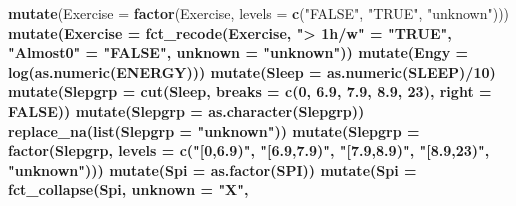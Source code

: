 \documentclass[
]{article}
\newenvironment{Shaded}{\begin{snugshade}}{\end{snugshade}}
\newcommand{\CommentTok}[1]{\textcolor[rgb]{0.56,0.35,0.01}{\textit{#1}}}
\newcommand{\DataTypeTok}[1]{\textcolor[rgb]{0.13,0.29,0.53}{#1}}
\newcommand{\DecValTok}[1]{\textcolor[rgb]{0.00,0.00,0.81}{#1}}
\newcommand{\FloatTok}[1]{\textcolor[rgb]{0.00,0.00,0.81}{#1}}
\newcommand{\KeywordTok}[1]{\textcolor[rgb]{0.13,0.29,0.53}{\textbf{#1}}}
\newcommand{\NormalTok}[1]{#1}
\newcommand{\OperatorTok}[1]{\textcolor[rgb]{0.81,0.36,0.00}{\textbf{#1}}}
\newcommand{\OtherTok}[1]{\textcolor[rgb]{0.56,0.35,0.01}{#1}}
\newcommand{\StringTok}[1]{\textcolor[rgb]{0.31,0.60,0.02}{#1}}
\begin{document}
\begin{Shaded}
\begin{Highlighting}[]
{{{{{{{{{{{{{{{{{{{{{{{{{{{{{\StringTok{  }\KeywordTok{mutate}\NormalTok{(}\DataTypeTok{Exercise =} \KeywordTok{factor}\NormalTok{(Exercise, }\DataTypeTok{levels =} \KeywordTok{c}\NormalTok{(}\StringTok{"FALSE"}\NormalTok{, }\StringTok{"TRUE"}\NormalTok{, }\StringTok{"unknown"}\NormalTok{))) }\OperatorTok{%
\StringTok{  }\KeywordTok{mutate}\NormalTok{(}\DataTypeTok{Exercise =} \KeywordTok{fct_recode}\NormalTok{(Exercise, }
                               \StringTok{"> 1h/w"}\NormalTok{ =}\StringTok{ "TRUE"}\NormalTok{, }
                               \StringTok{"Almost0"}\NormalTok{ =}\StringTok{ "FALSE"}\NormalTok{, }
                               \DataTypeTok{unknown   =} \StringTok{"unknown"}\NormalTok{)) }\OperatorTok{%
\StringTok{  }\KeywordTok{mutate}\NormalTok{(}\DataTypeTok{Engy =} \KeywordTok{log}\NormalTok{(}\KeywordTok{as.numeric}\NormalTok{(ENERGY))) }\OperatorTok{%
\StringTok{  }\KeywordTok{mutate}\NormalTok{(}\DataTypeTok{Sleep =} \KeywordTok{as.numeric}\NormalTok{(SLEEP)}\OperatorTok{/}\DecValTok{10}\NormalTok{) }\OperatorTok{%
\StringTok{  }\KeywordTok{mutate}\NormalTok{(}\DataTypeTok{Slepgrp =} \KeywordTok{cut}\NormalTok{(Sleep, }\DataTypeTok{breaks =} \KeywordTok{c}\NormalTok{(}\DecValTok{0}\NormalTok{, }\FloatTok{6.9}\NormalTok{, }\FloatTok{7.9}\NormalTok{, }\FloatTok{8.9}\NormalTok{, }\DecValTok{23}\NormalTok{), }\DataTypeTok{right =} \OtherTok{FALSE}\NormalTok{)) }\OperatorTok{%
\StringTok{  }\KeywordTok{mutate}\NormalTok{(}\DataTypeTok{Slepgrp =} \KeywordTok{as.character}\NormalTok{(Slepgrp)) }\OperatorTok{%
\StringTok{  }\KeywordTok{replace_na}\NormalTok{(}\KeywordTok{list}\NormalTok{(}\DataTypeTok{Slepgrp =} \StringTok{"unknown"}\NormalTok{)) }\OperatorTok{%
\StringTok{  }\KeywordTok{mutate}\NormalTok{(}\DataTypeTok{Slepgrp =} \KeywordTok{factor}\NormalTok{(Slepgrp, }\DataTypeTok{levels =} \KeywordTok{c}\NormalTok{(}\StringTok{"[0,6.9)"}\NormalTok{,}
                                            \StringTok{"[6.9,7.9)"}\NormalTok{,}
                                            \StringTok{"[7.9,8.9)"}\NormalTok{, }
                                            \StringTok{"[8.9,23)"}\NormalTok{, }\StringTok{"unknown"}\NormalTok{))) }\OperatorTok{%
\StringTok{  }\KeywordTok{mutate}\NormalTok{(}\DataTypeTok{Spi =} \KeywordTok{as.factor}\NormalTok{(SPI)) }\OperatorTok{%
\StringTok{  }\KeywordTok{mutate}\NormalTok{(}\DataTypeTok{Spi =} \KeywordTok{fct_collapse}\NormalTok{(Spi, }
                            \DataTypeTok{unknown =} \StringTok{"X"}\NormalTok{, }
}}}}}}}}}}}}}}}}}}}}}}}}}}}}}}}}}}}}}}
\end{Highlighting}
\end{Shaded}
\end{document}
